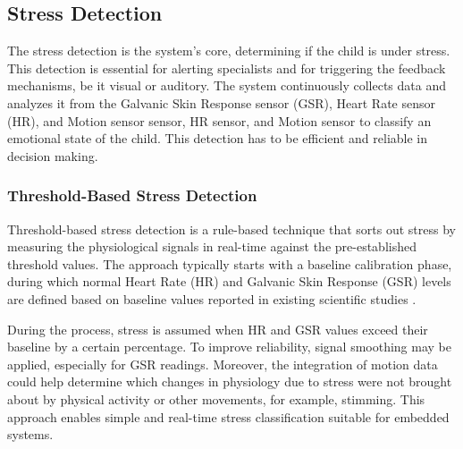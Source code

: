 \documentclass[a4paper,12pt]{report}
\begin{document}
\subsection{Stress Detection}

The stress detection is the system's core, determining if the child is under stress. This detection is essential for alerting specialists and for triggering the feedback mechanisms, be it visual or auditory. The system continuously collects data and analyzes it from the Galvanic Skin Response sensor (GSR), Heart Rate sensor (HR), and Motion sensor sensor, HR sensor, and Motion sensor to classify an emotional state of the child. This detection has to be efficient and reliable in decision making.
\subsubsection{Threshold-Based Stress Detection}
Threshold-based stress detection is a rule-based technique that sorts out stress by measuring the physiological signals in real-time against the pre-established threshold values. The approach typically starts with a baseline calibration phase, during which normal Heart Rate (HR) and Galvanic Skin Response (GSR) levels are defined based on baseline values reported in existing scientific studies \cite{hr_stress_asd_2019} \cite{eda_baseline_threshold_2023}. 

During the process, stress is assumed when HR and GSR values exceed their baseline by a certain percentage. To improve reliability, signal smoothing may be applied, especially for GSR readings. Moreover, the integration of motion data could help determine which changes in physiology due to stress were not brought about by physical activity or other movements, for example, stimming. This approach enables simple and real-time stress classification suitable for embedded systems.
\end{document}
